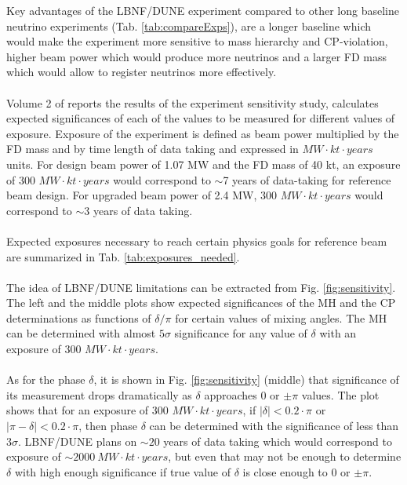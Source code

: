Key advantages of the LBNF/DUNE experiment compared to other long baseline neutrino experiments (Tab. \ref{tab:compareExps}), are a longer baseline which would make the experiment more sensitive to mass hierarchy and CP-violation, higher beam power which would produce more neutrinos and a larger FD mass which would allow to register neutrinos more effectively. \\ \\
Volume 2 of \cite{ref_LBNF_CDR} reports the results of the experiment sensitivity study, calculates expected significances of each of the values to be measured for different values of exposure. Exposure of the experiment is defined as beam power multiplied by the FD mass and by time length of data taking and expressed in $MW \cdot kt \cdot years$ units. For design beam power of 1.07 MW and the FD mass of 40 kt, an exposure of 300 $MW \cdot kt \cdot years$ would correspond to $\sim$7 years of data-taking for reference beam design. For upgraded beam power of 2.4 MW, 300 $MW \cdot kt \cdot years$ would correspond to $\sim$3 years of data taking.\\ \\
Expected exposures necessary to reach certain physics goals for reference beam are summarized in Tab. \ref{tab:exposures_needed}. \\ \\
The idea of LBNF/DUNE limitations can be extracted from Fig. \ref{fig:sensitivity}. The left and the middle plots show expected significances of the MH and the CP determinations as functions of $\delta/\pi$ for certain values of mixing angles. The MH can be determined with almost $5\sigma$ significance for any value of $\delta$ with an exposure of 300 $MW \cdot kt \cdot years$. \\ \\
As for the phase $\delta$, it is shown in Fig. \ref{fig:sensitivity} (middle) that significance of its measurement drops dramatically as $\delta$ approaches 0 or $\pm\pi$ values. The plot shows that for an exposure of 300 $MW \cdot kt \cdot years$, if $|\delta|<0.2\cdot\pi$ or $|\pi-\delta|<0.2\cdot\pi$, then phase $\delta$ can be determined with the significance of less than $3\sigma$. LBNF/DUNE plans on $\sim 20$ years of data taking which would correspond to exposure of $\sim 2000~MW \cdot kt \cdot years$, but even that may not be enough to determine $\delta$ with high enough significance if true value of $\delta$ is close enough to 0 or $\pm\pi$. \\ \\
